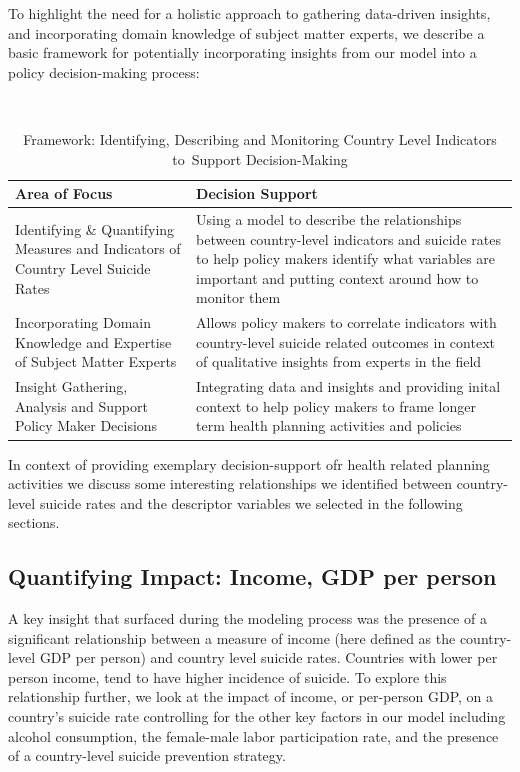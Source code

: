 \documentclass[]{article}
\begin{document}
To highlight the need for a holistic approach to gathering data-driven
insights, and incorporating domain knowledge of subject matter experts,
we describe a basic framework for potentially incorporating insights
from our model into a policy decision-making process:

\begin{table}[H]
\centering 
\caption{Framework: Identifying, Describing and Monitoring Country Level Indicators to Support Decision-Making}
\
\begin{tabular}{p{7cm}p{9cm}}  
\hline  
   Area of Focus  & Decision Support  \\   
\hline 
 Identifying \& Quantifying Measures and Indicators of Country Level Suicide Rates &  Using a model to describe the relationships between country-level indicators and suicide rates to help policy makers identify what variables are important and putting context around how to monitor them \\   
 \hline 
Incorporating Domain Knowledge and Expertise of Subject Matter Experts & Allows policy makers to correlate indicators with country-level suicide related outcomes in context of qualitative insights from experts in the field \\   
\hline 
Insight Gathering, Analysis and Support Policy Maker Decisions & Integrating data and insights and providing inital context to help policy makers to frame longer term health planning activities and policies \\
\hline 
\end{tabular} 
\end{table}

In context of providing exemplary decision-support ofr health related
planning activities we discuss some interesting relationships we
identified between country-level suicide rates and the descriptor
variables we selected in the following sections.

\subsection{Quantifying Impact: Income, GDP per
person}\label{quantifying-impact-income-gdp-per-person}

A key insight that surfaced during the modeling process was the presence
of a significant relationship between a measure of income (here defined
as the country-level GDP per person) and country level suicide rates.
Countries with lower per person income, tend to have higher incidence of
suicide. To explore this relationship further, we look at the impact of
income, or per-person GDP, on a country's suicide rate controlling for
the other key factors in our model including alcohol consumption, the
female-male labor participation rate, and the presence of a
country-level suicide prevention strategy.
\end{document}
